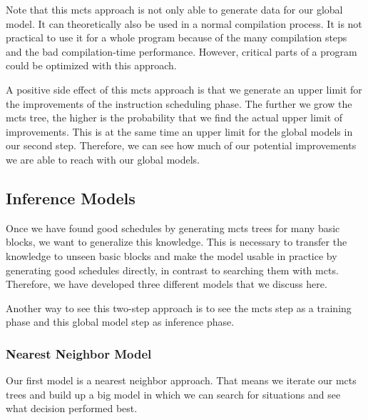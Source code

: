Note that this \ac{mcts} approach is not only able to generate data for our global model.
It can theoretically also be used in a normal compilation process.
It is not practical to use it for a whole program because of the many compilation steps and the bad compilation-time performance.
However, critical parts of a program could be optimized with this approach.

A positive side effect of this \ac{mcts} approach is that we generate an upper limit for the improvements of the instruction scheduling phase.
The further we grow the \ac{mcts} tree, the higher is the probability that we find the actual upper limit of improvements.
This is at the same time an upper limit for the global models in our second step.
Therefore, we can see how much of our potential improvements we are able to reach with our global models.

\subsection{Inference Models}
\label{subsec:approach:ml:global}
Once we have found good schedules by generating \ac{mcts} trees for many basic blocks, we want to generalize this knowledge.
This is necessary to transfer the knowledge to unseen basic blocks and make the model usable in practice by generating good schedules directly, in contrast to searching them with \ac{mcts}.
Therefore, we have developed three different models that we discuss here.

Another way to see this two-step approach is to see the \ac{mcts} step as a training phase and this global model step as inference phase.

\subsubsection{Nearest Neighbor Model}
\label{sec:app:nearest-neighbor}
Our first model is a nearest neighbor approach.
That means we iterate our \ac{mcts} trees and build up a big model in which we can search for situations and see what decision performed best.

